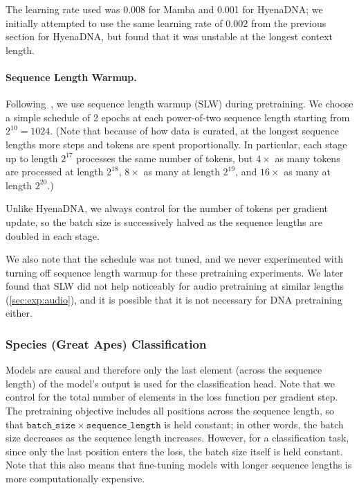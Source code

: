 The learning rate used was $0.008$ for Mamba and 0.001 for HyenaDNA;
we initially attempted to use the same learning rate of $0.002$ from the previous section for HyenaDNA, but found that it was unstable at the longest context length.

\paragraph{Sequence Length Warmup.}
Following~\citep{nguyen2023hyenadna}, we use sequence length warmup (SLW) during pretraining.
We choose a simple schedule of 2 epochs at each power-of-two sequence length starting from $2^{10}=1024$.
(Note that because of how data is curated, at the longest sequence lengths more steps and tokens are spent proportionally.
In particular, each stage up to length $2^{17}$ processes the same number of tokens,
but $4\times$ as many tokens are processed at length $2^{18}$, $8\times$ as many at length $2^{19}$, and $16\times$ as many at length $2^{20}$.)

Unlike HyenaDNA, we always control for the number of tokens per gradient update,
so the batch size is successively halved as the sequence lengths are doubled in each stage.

\begin{remark}
  We also note that the schedule was not tuned, and we never experimented with turning off sequence length warmup for these pretraining experiments.
  We later found that SLW did not help noticeably for audio pretraining at similar lengths (\cref{sec:exp:audio}), and it is possible that it is not necessary for DNA pretraining either.
\end{remark}

\subsubsection{Species (Great Apes) Classification}

Models are causal and therefore only the last element (across the sequence length) of the model's output is used for the classification head.
Note that we control for the total number of elements in the loss function per gradient step.
The pretraining objective includes all positions across the sequence length,
so that $\mathtt{batch\_size} \times \mathtt{sequence\_length}$ is held constant; in other words, the batch size decreases as the sequence length increases.
However, for a classification task, since only the last position enters the loss,
the batch size itself is held constant.
Note that this also means that fine-tuning models with longer sequence lengths is more computationally expensive.

